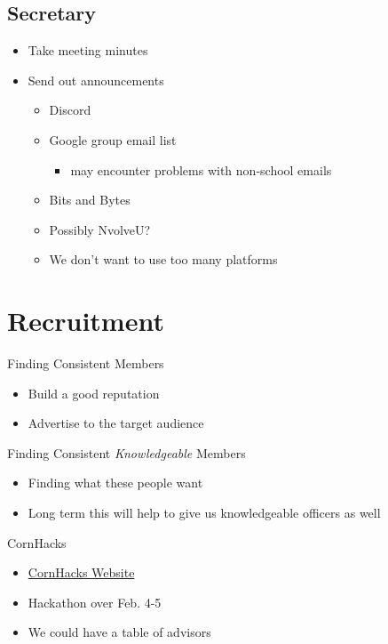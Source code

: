     \subsection{Secretary}
        \begin{itemize}
            \item Take meeting minutes
            \item Send out announcements
            \begin{itemize}
                \item Discord
                \item Google group email list
                \begin{itemize}
                    \item may encounter problems with non-school emails
                \end{itemize}
                \item Bits and Bytes
                \item Possibly NvolveU?
                \item We don't want to use too many platforms
            \end{itemize}
            
        \end{itemize}

\section{Recruitment}
Finding Consistent Members
    \begin{itemize}
        \item Build a good reputation
        \item Advertise to the target audience
    \end{itemize}
Finding Consistent \emph{Knowledgeable} Members
    \begin{itemize}
        \item Finding what these people want
        \item Long term this will help to give us knowledgeable officers as well
    \end{itemize}
CornHacks
    \begin{itemize}
        \item \href{https://unlcornhacks.com/#/home}{CornHacks Website}
        \item Hackathon over Feb. 4-5
        \item We could have a table of advisors
    \end{itemize}

